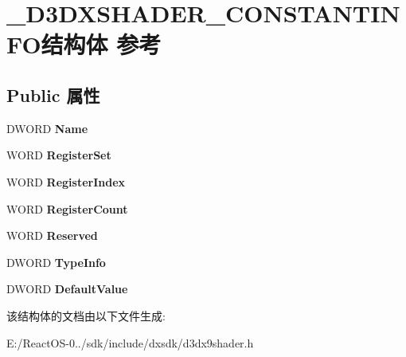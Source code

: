 \hypertarget{struct___d3_d_x_s_h_a_d_e_r___c_o_n_s_t_a_n_t_i_n_f_o}{}\section{\+\_\+\+D3\+D\+X\+S\+H\+A\+D\+E\+R\+\_\+\+C\+O\+N\+S\+T\+A\+N\+T\+I\+N\+F\+O结构体 参考}
\label{struct___d3_d_x_s_h_a_d_e_r___c_o_n_s_t_a_n_t_i_n_f_o}
\subsection*{Public 属性}
\begin{DoxyCompactItemize}
\item 
\mbox{\label{struct___d3_d_x_s_h_a_d_e_r___c_o_n_s_t_a_n_t_i_n_f_o_abd5cde129c3cceb4bc6a732deb5ee444}} 
D\+W\+O\+RD {\bfseries Name}
\item 
\mbox{\label{struct___d3_d_x_s_h_a_d_e_r___c_o_n_s_t_a_n_t_i_n_f_o_af2ea7de934ee968c63ac8fb644ff373c}} 
W\+O\+RD {\bfseries Register\+Set}
\item 
\mbox{\label{struct___d3_d_x_s_h_a_d_e_r___c_o_n_s_t_a_n_t_i_n_f_o_ab405206090b79cfd77240ae5757bf39e}} 
W\+O\+RD {\bfseries Register\+Index}
\item 
\mbox{\label{struct___d3_d_x_s_h_a_d_e_r___c_o_n_s_t_a_n_t_i_n_f_o_a4b9793647754584ecb8e09a17a30bc3f}} 
W\+O\+RD {\bfseries Register\+Count}
\item 
\mbox{\label{struct___d3_d_x_s_h_a_d_e_r___c_o_n_s_t_a_n_t_i_n_f_o_ac89f9f356b62e45716d0d179942ca03f}} 
W\+O\+RD {\bfseries Reserved}
\item 
\mbox{\label{struct___d3_d_x_s_h_a_d_e_r___c_o_n_s_t_a_n_t_i_n_f_o_ad3afe564cf82672e140c74bf00a059e8}} 
D\+W\+O\+RD {\bfseries Type\+Info}
\item 
\mbox{\label{struct___d3_d_x_s_h_a_d_e_r___c_o_n_s_t_a_n_t_i_n_f_o_aa8326a6f0ed6af609dde495ed31ba1b8}} 
D\+W\+O\+RD {\bfseries Default\+Value}
\end{DoxyCompactItemize}


该结构体的文档由以下文件生成\+:\begin{DoxyCompactItemize}
\item 
E\+:/\+React\+O\+S-\/0../sdk/include/dxsdk/d3dx9shader.\+h\end{DoxyCompactItemize}
